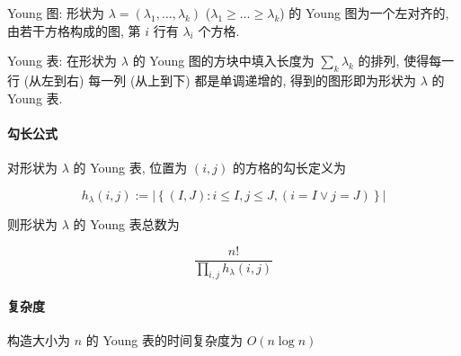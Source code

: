 Young 图: 形状为 \(\lambda=(\lambda_1,\dots,\lambda_k)\) (\(\lambda_1\geq \dots\geq \lambda_k\)) 的 Young 图为一个左对齐的, 由若干方格构成的图, 第 \(i\) 行有 \(\lambda_i\) 个方格.

Young 表: 在形状为 \(\lambda\) 的 Young 图的方块中填入长度为 \(\sum_k \lambda_k\) 的排列, 使得每一行 (从左到右) 每一列 (从上到下) 都是单调递增的, 得到的图形即为形状为 \(\lambda\) 的 Young 表.

\paragraph{勾长公式}

对形状为 \(\lambda\) 的 Young 表, 位置为 \((i,j)\) 的方格的勾长定义为

\[
    h_{\lambda}(i,j):=\left|\left\{(I,J):i\leq I, j\leq J,(i=I \lor j=J)\right\}\right|
\]

则形状为 \(\lambda\) 的 Young 表总数为

\[
    \frac{n!}{\prod_{i,j} h_{\lambda}(i,j)}
\]

\paragraph{复杂度}

构造大小为 \(n\) 的 Young 表的时间复杂度为 \(O(n\log n)\)
